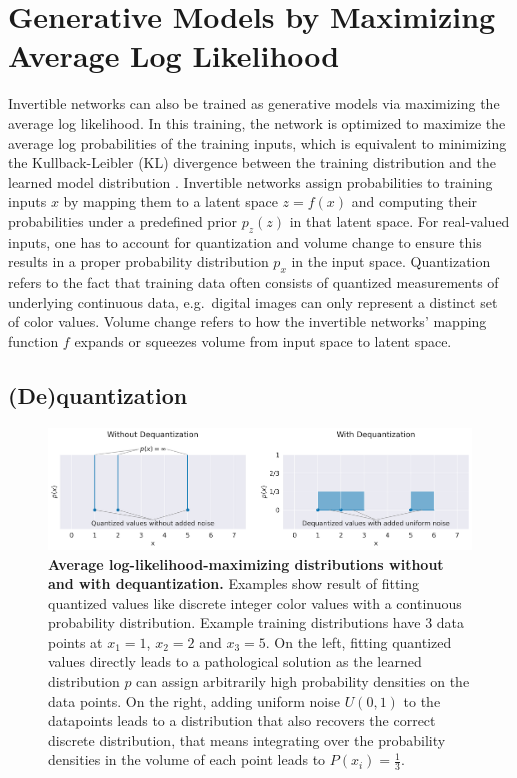 \section{Generative Models by Maximizing Average Log
Likelihood}\label{generative-models-by-maximizing-average-log-likelihood}

    Invertible networks can also be trained as generative models via
maximizing the average log likelihood. In this training, the network is
optimized to maximize the average log probabilities of the training
inputs, which is equivalent to minimizing the Kullback-Leibler (KL)
divergence between the training distribution and the learned model
distribution \cite{DBLP:journals/corr/TheisOB15}. Invertible
networks assign probabilities to training inputs $x$ by mapping them
to a latent space $z=f(x)$ and computing their probabilities under a
predefined prior $p_z(z)$ in that latent space. For real-valued
inputs, one has to account for quantization and volume change to ensure
this results in a proper probability distribution $p_x$ in the input
space. Quantization refers to the fact that training data often consists
of quantized measurements of underlying continuous data, e.g.~digital
images can only represent a distinct set of color values. Volume change
refers to how the invertible networks' mapping function $f$ expands or
squeezes volume from input space to latent space.

\subsection{(De)quantization}\label{dequantization}
    
\begin{figure}[ht]
    \myfloatalign
    \includegraphics[width=1\linewidth]{images/dequantization.png}
    \caption[Average log-likelihood-maximizing distributions without and with
dequantization]{
\textbf{Average log-likelihood-maximizing distributions without and with
dequantization.} Examples show result of fitting quantized values like
discrete integer color values with a continuous probability
distribution. Example training distributions have 3 data points at
$x_1=1$, $x_2=2$ and $x_3=5$. On the left, fitting quantized
values directly leads to a pathological solution as the learned
distribution $p$ can assign arbitrarily high probability densities on
the data points. On the right, adding uniform noise $U(0,1)$ to the
datapoints leads to a distribution that also recovers the correct
discrete distribution, that means integrating over the probability
densities in the volume of each point leads to $P(x_i)=\frac{1}{3}$.
}
\label{dequantization-fig}
\end{figure}

